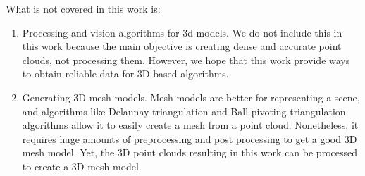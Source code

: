 What is not covered in this work is:

\begin{enumerate}
    \item Processing and vision algorithms for 3d models. We do not include this in this work because the main objective is creating dense and accurate point clouds, not processing them. However, we hope that this work provide ways to obtain reliable data for 3D-based algorithms.
    \item Generating 3D mesh models. Mesh models are better for representing a scene, and algorithms like Delaunay triangulation and Ball-pivoting triangulation algorithms allow it to easily create a mesh from a point cloud. Nonetheless, it requires huge amounts of preprocessing and post processing to get a good 3D mesh model. Yet, the 3D point clouds resulting in this work can be processed to create a 3D mesh model.
\end{enumerate}
